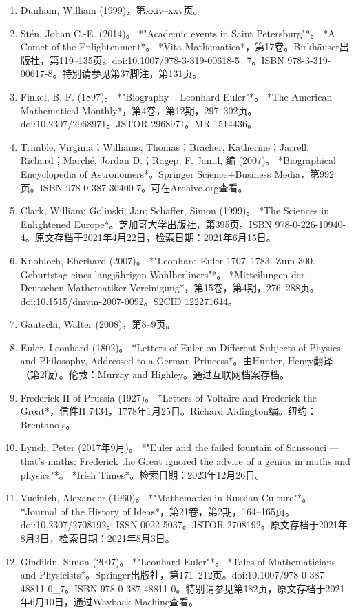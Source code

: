 \begin{enumerate}
\item Dunham, William (1999)，第xxiv–xxv页。  
\item Stén, Johan C.-E. (2014)。 *"Academic events in Saint Petersburg"*。 *A Comet of the Enlightenment*。 *Vita Mathematica*，第17卷。Birkhäuser出版社，第119–135页。doi:10.1007/978-3-319-00618-5_7。ISBN 978-3-319-00617-8。特别请参见第37脚注，第131页。  
\item Finkel, B. F. (1897)。 *"Biography – Leonhard Euler"*。 *The American Mathematical Monthly*，第4卷，第12期，297–302页。doi:10.2307/2968971。JSTOR 2968971。MR 1514436。  
\item Trimble, Virginia；Williams, Thomas；Bracher, Katherine；Jarrell, Richard；Marché, Jordan D.；Ragep, F. Jamil, 编 (2007)。 *Biographical Encyclopedia of Astronomers*。Springer Science+Business Media，第992页。ISBN 978-0-387-30400-7。可在Archive.org查看。
\item Clark, William; Golinski, Jan; Schaffer, Simon (1999)。 *The Sciences in Enlightened Europe*。芝加哥大学出版社，第395页。ISBN 978-0-226-10940-4。原文存档于2021年4月22日，检索日期：2021年6月15日。  
\item Knobloch, Eberhard (2007)。 *"Leonhard Euler 1707–1783. Zum 300. Geburtstag eines langjährigen Wahlberliners"*。 *Mitteilungen der Deutschen Mathematiker-Vereinigung*，第15卷，第4期，276–288页。doi:10.1515/dmvm-2007-0092。S2CID 122271644。  
\item Gautschi, Walter (2008)，第8–9页。  
\item Euler, Leonhard (1802)。 *Letters of Euler on Different Subjects of Physics and Philosophy, Addressed to a German Princess*。由Hunter, Henry翻译（第2版）。伦敦：Murray and Highley。通过互联网档案存档。  
\item Frederick II of Prussia (1927)。 *Letters of Voltaire and Frederick the Great*，信件H 7434，1778年1月25日。Richard Aldington编。纽约：Brentano's。  
\item Lynch, Peter (2017年9月)。 *"Euler and the failed fountain of Sanssouci — that's maths: Frederick the Great ignored the advice of a genius in maths and physics"*。 *Irish Times*。检索日期：2023年12月26日。  
\item Vucinich, Alexander (1960)。 *"Mathematics in Russian Culture"*。 *Journal of the History of Ideas*，第21卷，第2期，164–165页。doi:10.2307/2708192。ISSN 0022-5037。JSTOR 2708192。原文存档于2021年8月3日，检索日期：2021年8月3日。  
\item Gindikin, Simon (2007)。 *"Leonhard Euler"*。 *Tales of Mathematicians and Physicists*。Springer出版社，第171–212页。doi:10.1007/978-0-387-48811-0_7。ISBN 978-0-387-48811-0。特别请参见第182页，原文存档于2021年6月10日，通过Wayback Machine查看。  

\end{enumerate}
